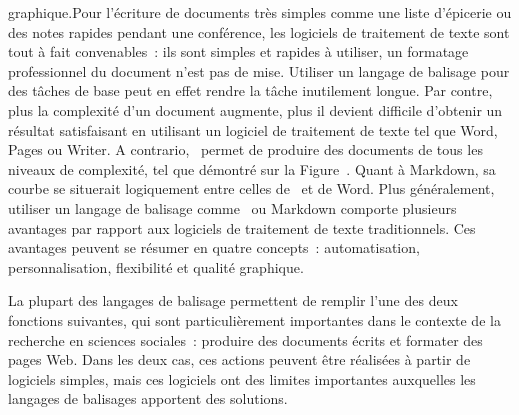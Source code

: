 \documentclass[
  letterpaper,
]{scrbook}
\begin{document}
{{{graphique.}{Pour l'écriture de documents très simples comme une liste d'épicerie ou des notes rapides pendant une conférence, les logiciels de traitement de texte sont tout à fait convenables~: ils sont simples et rapides à utiliser, un formatage professionnel du document n'est pas de mise. Utiliser un langage de balisage pour des tâches de base peut en effet rendre la tâche inutilement longue. Par contre, plus la complexité d'un document augmente, plus il devient difficile d'obtenir un résultat satisfaisant en utilisant un logiciel de traitement de texte tel que Word, Pages ou Writer. A contrario, ~permet de produire des documents de tous les niveaux de complexité, tel que démontré sur la Figure~. Quant à Markdown, sa courbe se situerait logiquement entre celles de ~et de Word. Plus généralement, utiliser un langage de balisage comme ~ou Markdown comporte plusieurs avantages par rapport aux logiciels de traitement de texte traditionnels. Ces avantages peuvent se résumer en quatre concepts~: automatisation, personnalisation, flexibilité et qualité graphique.}}\label{pour-luxe9criture-de-documents-truxe8s-simples-comme-une-liste-duxe9picerie-ou-des-notes-rapides-pendant-une-confuxe9rence-les-logiciels-de-traitement-de-texte-sont-tout-uxe0-fait-convenables-ils-sont-simples-et-rapides-uxe0-utiliser-un-formatage-professionnel-du-document-nest-pas-de-mise.-utiliser-un-langage-de-balisage-pour-des-tuxe2ches-de-base-peut-en-effet-rendre-la-tuxe2che-inutilement-longue.-par-contre-plus-la-complexituxe9-dun-document-augmente-plus-il-devient-difficile-dobtenir-un-ruxe9sultat-satisfaisant-en-utilisant-un-logiciel-de-traitement-de-texte-tel-que-word-pages-ou-writer.-a-contrario-permet-de-produire-des-documents-de-tous-les-niveaux-de-complexituxe9-tel-que-duxe9montruxe9-sur-la-fig-latex-vs-word.-quant-uxe0-markdown-sa-courbe-se-situerait-logiquement-entre-celles-de-et-de-word.-plus-guxe9nuxe9ralement-utiliser-un-langage-de-balisage-comme-ou-markdownchapitre_5-4-comporte-plusieurs-avantages-par-rapport-aux-logiciels-de-traitement-de-texte-traditionnels.-ces-avantages-peuvent-se-ruxe9sumer-en-quatre-concepts-automatisation-personnalisation-flexibilituxe9-et-qualituxe9-graphique.}}

La plupart des langages de balisage permettent de remplir l'une des deux
fonctions suivantes, qui sont particulièrement importantes dans le
contexte de la recherche en sciences sociales~: produire des documents
écrits et formater des pages Web. Dans les deux cas, ces actions peuvent
être réalisées à partir de logiciels simples, mais ces logiciels ont des
limites importantes auxquelles les langages de balisages apportent des
solutions.
\end{document}
